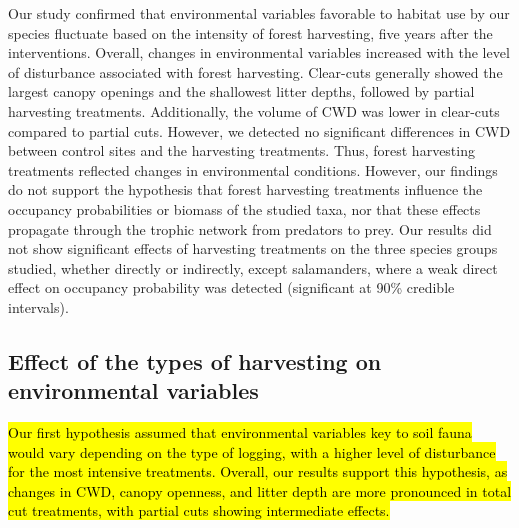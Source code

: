 Our study confirmed that environmental variables favorable to habitat use by our species fluctuate based on the intensity of forest harvesting, five years after the interventions. 
Overall, changes in environmental variables increased with the level of disturbance associated with forest harvesting. 
Clear-cuts generally showed the largest canopy openings and the shallowest litter depths, followed by partial harvesting treatments. 
Additionally, the volume of CWD was lower in clear-cuts compared to partial cuts. However, we detected no significant differences in CWD between control sites and the harvesting treatments. 
Thus, forest harvesting treatments reflected changes in environmental conditions. 
However, our findings do not support the hypothesis that forest harvesting treatments influence the occupancy probabilities or biomass of the studied taxa, nor that these effects propagate through the trophic network from predators to prey. 
Our results did not show significant effects of harvesting treatments on the three species groups studied, whether directly or indirectly, 
except salamanders, where a weak direct effect on occupancy probability was detected (significant at 90\% credible intervals). 


\subsection*{Effect of the types of harvesting on environmental variables}
\label{disc:env_var}

\hl{Our first hypothesis assumed that environmental variables key to soil fauna would vary depending on the type of logging, with a higher level of disturbance for the most intensive treatments. 
Overall, our results support this hypothesis, as changes in CWD, canopy openness, and litter depth are more pronounced in total cut treatments, with partial cuts showing intermediate effects.} 

